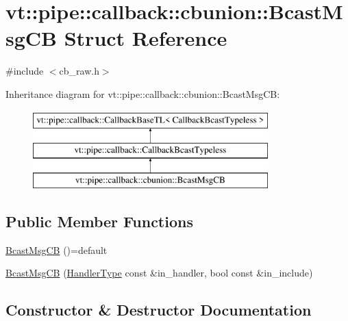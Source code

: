 \hypertarget{structvt_1_1pipe_1_1callback_1_1cbunion_1_1_bcast_msg_c_b}{}\section{vt\+:\+:pipe\+:\+:callback\+:\+:cbunion\+:\+:Bcast\+Msg\+CB Struct Reference}
\label{structvt_1_1pipe_1_1callback_1_1cbunion_1_1_bcast_msg_c_b}


{\ttfamily \#include $<$cb\+\_\+raw.\+h$>$}

Inheritance diagram for vt\+:\+:pipe\+:\+:callback\+:\+:cbunion\+:\+:Bcast\+Msg\+CB\+:\begin{figure}[H]
\begin{center}
\leavevmode
\includegraphics[height=3.000000cm]{structvt_1_1pipe_1_1callback_1_1cbunion_1_1_bcast_msg_c_b}
\end{center}
\end{figure}
\subsection*{Public Member Functions}
\begin{DoxyCompactItemize}
\item 
\hyperlink{structvt_1_1pipe_1_1callback_1_1cbunion_1_1_bcast_msg_c_b_a8fa08a4758e1d59288d60b55230c9fe5}{Bcast\+Msg\+CB} ()=default
\item 
\hyperlink{structvt_1_1pipe_1_1callback_1_1cbunion_1_1_bcast_msg_c_b_a84205a21e90133ba3f52ceebac33d49e}{Bcast\+Msg\+CB} (\hyperlink{namespacevt_af64846b57dfcaf104da3ef6967917573}{Handler\+Type} const \&in\+\_\+handler, bool const \&in\+\_\+include)
\end{DoxyCompactItemize}


\subsection{Constructor \& Destructor Documentation}
\mbox{\label{structvt_1_1pipe_1_1callback_1_1cbunion_1_1_bcast_msg_c_b_a8fa08a4758e1d59288d60b55230c9fe5}} 

